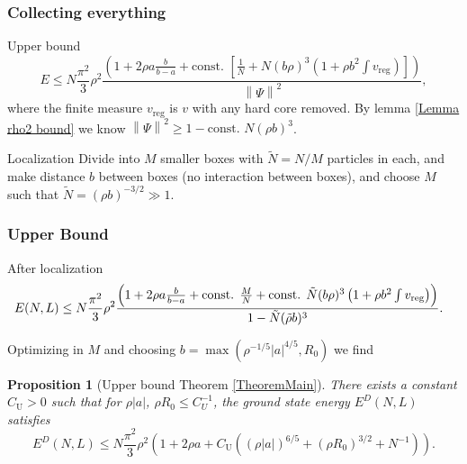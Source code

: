 \documentclass{beamer}[10]
\newcommand{\norm}[1]{\left\lVert #1 \right\rVert}
\newcommand{\abs}[1]{\left\lvert #1 \right\rvert}
\newtheorem{mproposition}{Proposition}
\begin{document}
\begin{frame}
	\frametitle{Collecting everything}
	\begin{block}{Upper bound}
	\begin{equation}
	E\leq N\frac{\pi^2}{3}\rho^2\frac{\left(1+2\rho a\frac{b}{b-a} +\text{const. } \left[\frac{1}{N}+ N (b\rho)^3\left(1+\rho b^2\int v_{\text{reg}}\right)\right]\right)}{\norm{\Psi}^2},
	\end{equation}	
	where  the finite measure $ v_{\text{reg}} $ is $v$ with any hard core removed.
		By lemma \ref{Lemma rho2 bound} we know $ \norm{\Psi}^2\geq 1-\text{const. }N(\rho b)^3 $.
	\end{block}	
	\begin{block}{Localization}
		Divide into $ M $ smaller boxes with $ \tilde{N}=N/M $ particles in each, and make distance $ b $ between boxes (no interaction between boxes), and choose $ M $ such that $ \tilde{N}=(\rho b)^{-3/2}\gg 1 $.
	\end{block}

\end{frame}

\begin{frame}
	\frametitle{Upper Bound}
	\begin{block}{After localization}
\small\begin{equation}
\hspace{-0.3cm}E(N,L)\leq N\frac{\pi^2}{3}\rho^2\frac{\left(1+2\rho a\frac{b}{b-a}+\text{const. }\frac{M}{N}+\text{const. }\tilde{N}(b\rho)^3\left(1+\rho b^2\int v_{\text{reg}}\right)\right)}{1-\tilde{N}(\tilde{\rho} b)^3}.
\end{equation}

Optimizing in $ M $ and choosing $ b=\max(\rho^{-1/5}\abs{a}^{4/5}, R_0) $ we find

\begin{mproposition}[Upper bound Theorem \ref{TheoremMain}]
	\label{PropositionUpperBound}
 There exists a constant $C_\text{U}>0$ such that for $\rho|a|$, $\rho R_0\leq C_U^{-1}$, the ground state energy $E^D(N,L)$ satisfies
	\small{\begin{equation}
	\label{equpper}
	E^D(N,L)\leq N\frac{\pi^2}{3}\rho^2\left(1+2\rho a + C_\text{U}\left((\rho\abs{a})^{6/5}+(\rho R_0)^{3/2}+N^{-1}\right)\right).
	\end{equation}}
\end{mproposition}

	\end{block}
	
\end{frame}
\end{document}
